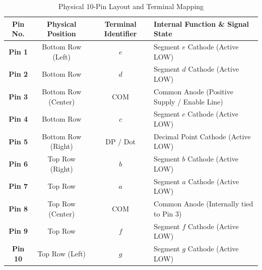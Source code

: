\documentclass[journal,12pt,onecolumn]{IEEEtran}
\begin{document}
		\begin{table}[H]
			\centering
			\caption{Physical 10-Pin Layout and Terminal Mapping}
			\label{tab:ca_pinout_table}
			\begin{tabular}{|c|c|c|l|}
				\hline
				\textbf{Pin No.} & \textbf{Physical Position} & \textbf{Terminal Identifier} & \textbf{Internal Function \& Signal State} \\ \hline
				\textbf{Pin 1} & Bottom Row (Left) & $e$ & Segment $e$ Cathode (Active LOW) \\ \hline
				\textbf{Pin 2} & Bottom Row & $d$ & Segment $d$ Cathode (Active LOW) \\ \hline
				\textbf{Pin 3} & Bottom Row (Center) & COM & Common Anode (Positive Supply / Enable Line) \\ \hline
				\textbf{Pin 4} & Bottom Row & $c$ & Segment $c$ Cathode (Active LOW)\\ \hline
				\textbf{Pin 5} & Bottom Row (Right) & DP / Dot & Decimal Point Cathode (Active LOW) \\ \hline
				\textbf{Pin 6} & Top Row (Right) & $b$ & Segment $b$ Cathode (Active LOW)\\ \hline
				\textbf{Pin 7} & Top Row & $a$ & Segment $a$ Cathode (Active LOW) \\ \hline
				\textbf{Pin 8} & Top Row (Center) & COM & Common Anode (Internally tied to Pin 3)\\ \hline
				\textbf{Pin 9} & Top Row & $f$ & Segment $f$ Cathode (Active LOW)\\ \hline
				\textbf{Pin 10} & Top Row (Left) & $g$ & Segment $g$ Cathode (Active LOW) \\ \hline
			\end{tabular}
		\end{table}
		
\end{document}
